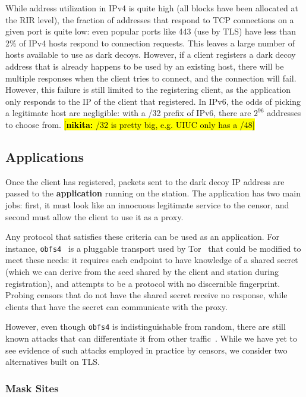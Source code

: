 \documentclass[letterpaper,twocolumn,10pt]{article}
\newcommand{\note}[2]{\hl{[\textbf{#1:} #2]}\xspace}
\newcommand{\nikita}[1]{\note{nikita}{#1}}
\begin{document}
While address utilization in IPv4 is quite high (all blocks have been allocated
at the RIR level), the fraction of addresses that respond to TCP connections on
a given port is quite low: even popular ports like 443 (use by TLS) have less
than 2\% of IPv4 hosts respond to connection requests. This leaves a large
number of hosts available to use as dark decoys. However, if a client registers
a dark decoy address that is already happens to be used by an existing host,
there will be multiple responses when the client tries to connect, and the
connection will fail. However, this failure is still limited to the registering
client, as the application only responds to the IP of the client that
registered. In IPv6, the odds of picking a legitimate host are negligible: with
a /32 prefix of IPv6, there are $2^{96}$ addresses to choose from.
\nikita{/32 is pretty big, e.g. UIUC only has a /48}


\subsection{Applications}


Once the client has registered, packets sent to the dark decoy IP address are
passed to the \textbf{application} running on the station. The application has
two main jobs: first, it must look like an innocuous legitimate service to the
censor, and second must allow the client to use it as a proxy.

Any protocol that satisfies these criteria can be used as an application. For
instance, \texttt{obfs4}~\cite{obfs4} is a pluggable transport used by
Tor~\cite{tor} that could be
modified to meet these needs: it requires each endpoint to have knowledge of a
shared secret (which we can derive from the seed shared by the client and
station during registration), and attempts to be a protocol with no discernible
fingerprint. Probing censors that do not have the shared secret receive no
response, while clients that have the secret can communicate with the proxy.

However, even though \texttt{obfs4} is indistinguishable from random, there are
still known attacks that can differentiate it from other
traffic~\cite{wang2015seeing}. While we have yet to see evidence of such attacks
employed in practice by censors, we consider two alternatives built on TLS.


\FigOverview

\subsubsection{Mask Sites}
\end{document}

